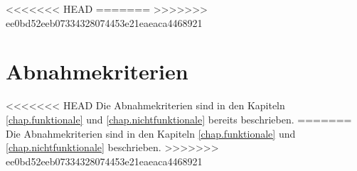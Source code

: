 %
<<<<<<< HEAD
=======
>>>>>>> ee0bd52eeb07334328074453e21eaeaca4468921
%

\thispagestyle{empty}
\chapter{Abnahmekriterien}\label{chap.abnahme}
<<<<<<< HEAD
Die Abnahmekriterien sind in den Kapiteln \ref{chap.funktionale} und \ref{chap.nichtfunktionale} bereits beschrieben.
=======
Die Abnahmekriterien sind in den Kapiteln \ref{chap.funktionale} und \ref{chap.nichtfunktionale} beschrieben.
>>>>>>> ee0bd52eeb07334328074453e21eaeaca4468921
